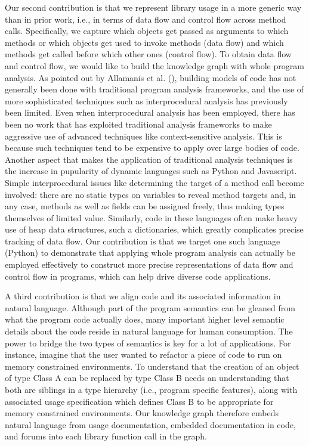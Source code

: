 Our second contribution is that we represent library usage in a more generic way than in prior work, i.e., in terms of data flow and control flow across method calls.  Specifically, we capture which objects get passed as arguments to which methods or which objects get used to invoke methods (data flow) and which methods get called before which other ones (control flow).  To obtain data flow and control flow, we would like to build the knowledge graph with whole program analysis.  As pointed out by Allamanis et al. (\cite{Allamanis:2018:SML:3236632.3212695}), building models of code has not generally been done with traditional program analysis frameworks, and the use of more sophisticated techniques such as interprocedural analysis has previously been limited.  Even when interprocedural analysis has been employed, there has been no work that has exploited traditional analysis frameworks to make aggressive use of advanced techniques like context-sensitive analysis.  This is because such techniques tend to be expensive to apply over large bodies of code.  
Another aspect that makes the application of traditional analysis techniques is the increase in pupularity of dynamic languages such as Python and Javascript.  Simple interprocedural issues like determining the target of a method call become involved: there are no static types on variables to reveal method targets and, in any case, methods as well as fields can be assigned freely, thus making types themselves of limited value.  Similarly, code in these languages often make heavy use of heap data structures, such a dictionaries, which greatly complicates precise tracking of data flow.  Our contribution is that we target one such language (Python) to demonstrate that applying whole program analysis can actually be employed effectively to construct more precise representations of data flow and control flow in programs, which can help drive diverse code applications.

A third contribution is that we align code and its associated information in natural language.  Although part of the program semantics can be gleaned from what the program code actually does, many important higher level semantic details about the code reside in natural language for human consumption.  The power to bridge the two types of semantics is key for a lot of applications.  For instance, imagine that the user wanted to refactor a piece of code to run on memory constrained environments.  To understand that the creation of an object of type Class A can be replaced by type Class B needs an understanding that both are siblings in a type hierarchy (i.e., program specific features), along with associated usage specification which defines Class B to be appropriate for memory constrained environments.  Our knowledge graph therefore embeds natural language from usage documentation, embedded documentation in code, and forums into each library function call in the graph.

